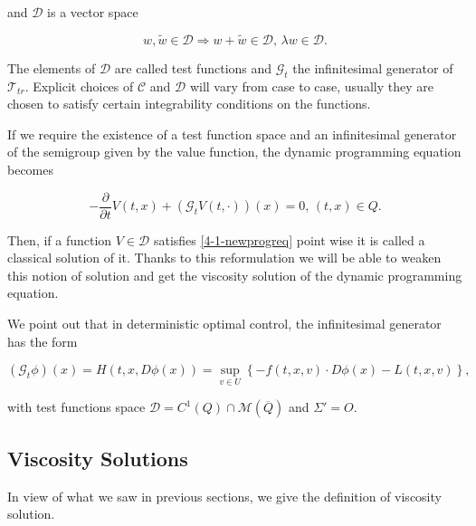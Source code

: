 and $\mathcal{D}$ is a vector space

\begin{equation}
    w,\tilde{w}\in\mathcal{D} \Rightarrow w+\tilde{w}\in\mathcal{D},\,\lambda w\in\mathcal{D}.
\end{equation}

The elements of $\mathcal{D}$ are called test functions and $\mathcal{G}_t$ the infinitesimal generator of $\mathcal{T}_{tr}$. Explicit choices of $\mathcal{C}$ and 
$\mathcal{D}$ will vary from case to case, usually they are chosen to satisfy certain integrability conditions on the functions. 

If we require the existence of a test function space and an infinitesimal generator of the semigroup given by the value function, the 
dynamic programming equation becomes

\begin{equation}\label{4-1-newprogreq}
    -\frac{\partial }{\partial t}V(t,x) + (\mathcal{G}_tV(t,\cdot))(x) = 0,\,(t,x)\in Q.
\end{equation}

Then, if a function $V\in\mathcal{D}$ satisfies \ref{4-1-newprogreq} point wise it is called a classical solution of it. Thanks to this reformulation we will be able 
to weaken this notion of solution and get the viscosity solution of the dynamic programming equation.

We point out that in deterministic optimal control, the infinitesimal generator has the form

\[(\mathcal{G}_t\phi)(x) = H(t,x,D\phi(x)) = \sup_{v \in U}\left\{-f(t,x,v)\cdot D\phi(x) - L(t,x,v)\right\},\]

with test functions space $\mathcal{D}= C^1(Q)\cap \mathcal{M}(\overline{Q})$ and $\Sigma'=O$.

\subsection{Viscosity Solutions}

In view of what we saw in previous sections, we give the definition of viscosity solution. 

